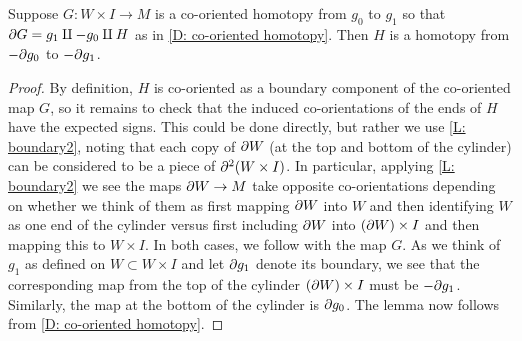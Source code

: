\begin{lemma}\label{L: co-oriented homotopy}
	Suppose $G \colon W \times I \to M$ is a co-oriented homotopy from $g_0$ to $g_1$ so that $\partial G = g_1 \amalg -g_0\amalg H$ as in \cref{D: co-oriented homotopy}.
	Then $H$ is a homotopy from $-\partial g_0$ to $-\partial g_1$.
\end{lemma}

\begin{proof}
	By definition, $H$ is co-oriented as a boundary component of the co-oriented map $G$, so it remains to check that the induced co-orientations of the ends of $H$ have the expected signs.
	This could be done directly, but rather we use \cref{L: boundary2}, noting that each copy of $\partial W$ (at the top and bottom of the cylinder) can be considered to be a piece of $\partial^2(W \times I)$.
	In particular, applying \cref{L: boundary2} we see the maps $\partial W \to M$ take opposite co-orientations depending on whether we think of them as first mapping $\partial W$ into $W$ and then identifying $W$ as one end of the cylinder versus first including $\partial W$ into $(\partial W) \times I$ and then mapping this to $W \times I$.
	In both cases, we follow with the map $G$.
	As we think of $g_1$ as defined on $W \subset W \times I$ and let $\partial g_1$ denote its boundary, we see that the corresponding map from the top of the cylinder $(\partial W) \times I$ must be $-\partial g_1$.
	Similarly, the map at the bottom of the cylinder is $\partial g_0$.
	The lemma now follows from \cref{D: co-oriented homotopy}.
\end{proof}


